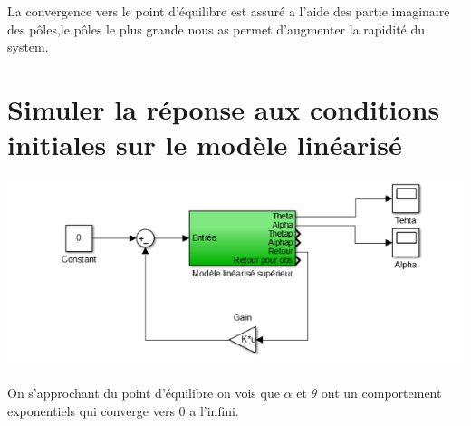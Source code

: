 \documentclass[12pt, a4paper, openany]{report}
\begin{document}
   La convergence vers le point d’équilibre est  assuré a l'aide des partie imaginaire des pôles,le pôles    le plus grande nous as permet d’augmenter la rapidité du system.\\ 
   
    \section{Simuler la réponse aux conditions initiales sur le modèle linéarisé}          
       
\begin{center}
\includegraphics[scale=0.6]{simdispol.png}
\label{simdispol}
\end{center}



     On s’approchant du point d’équilibre on vois que  $\alpha$ et $\theta$ ont un comportement exponentiels qui converge vers 0 a l'infini.\\ 
\end{document}
